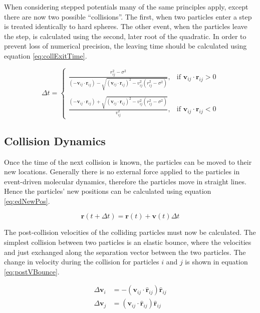 \message{ !name(main.tex)}\documentclass[12pt]{UoAthesis}
\begin{document}
When considering stepped potentials many of the same principles apply,
except there are now two possible ``collisions''. The first, when two
particles enter a step is treated identically to hard spheres. The
other event, when the particles leave the step, is calculated using
the second, later root of the quadratic.  In order to prevent loss of
numerical precision, the leaving time should be calculated using
equation \eqref{eq:collExitTime}.

\begin{equation}
  \label{eq:collExitTime}
\Delta t = 
\begin{cases}
  \frac{r_{ij}^2 - \sigma^2}{(-\mathbf{v}_{ij}\cdot\mathbf{r}_{ij})
    - \sqrt{(\mathbf{v}_{ij}\cdot\mathbf{r}_{ij})^2 
      - v_{ij}^2(r_{ij}^2 - \sigma^2)}}, & \text{if }
  \mathbf{v}_{ij}\cdot\mathbf{r}_{ij} > 0 \\
\\

\frac{(-\mathbf{v}_{ij}\cdot\mathbf{r}_{ij}) +
  \sqrt{(\mathbf{v}_{ij}\cdot\mathbf{r}_{ij})^2 - v_{ij}^2(r_{ij}^2 - \sigma^2)}}
     {v_{ij}^2} , & \text{if }
     \mathbf{v}_{ij}\cdot\mathbf{r}_{ij} < 0 
\end{cases}
\end{equation}

\subsection{Collision Dynamics}
Once the time of the next collision is known, the particles can be moved
to their new locations.  Generally there is no external force applied
to the particles in event-driven molecular dynamics, therefore the
particles move in straight lines.  Hence the particles' new positions
can be calculated using equation \eqref{eq:edNewPos}.

\begin{equation}
  \mathbf{r}(t+\Delta t) = \mathbf{r}(t) + \mathbf{v}(t)\Delta t 
  \label{eq:edNewPos}
\end{equation}

The post-collision velocities of the colliding particles must now be
calculated.  The simplest collision between two particles is an
elastic bounce, where the velocities and just exchanged along the
separation vector between the two particles.  The change in velocity
during the collision for particles $i$ and $j$ is shown in equation
\eqref{eq:postVBounce}.

\begin{subequations}
  \label{eq:postVBounce}
  \begin{align}
    \Delta\mathbf{v}_i &= -(\mathbf{v}_{ij}\cdot\mathbf{\hat{r}}_{ij})\mathbf{\hat{r}}_{ij} \\
    \Delta\mathbf{v}_j &= (\mathbf{v}_{ij}\cdot\mathbf{\hat{r}}_{ij})\mathbf{\hat{r}}_{ij}
  \end{align}
\end{subequations}
\end{document}
